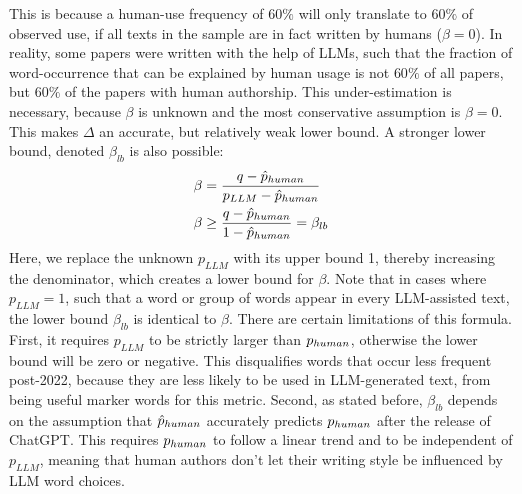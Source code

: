 This is because a human-use frequency of $60\%$ will only translate to $60\%$ of observed use, if all texts in the sample are in fact written by humans ($\beta=0$).
In reality, some papers were written with the help of LLMs, such that the fraction of word-occurrence that can be explained by human usage is not $60\%$ of all papers, but $60\%$ of the papers with human authorship.
This under-estimation is necessary, because $\beta$ is unknown and the most conservative assumption is $\beta=0$.
This makes $\Delta$ an accurate, but relatively weak lower bound.
A stronger lower bound, denoted $\beta_{lb}$ is also possible:
\begin{equation}\label{eq:beta_hat}
    \begin{split}
        \beta &= \frac{q -  \hat{p}_{human}}{p_{LLM}-\hat{p}_{human}}\\
        \beta &\ge \frac{q -  \hat{p}_{human}}{1-\hat{p}_{human}} = \beta_{lb}
    \end{split}
\end{equation}
Here, we replace the unknown $p_{LLM}$ with its upper bound 1, thereby increasing the denominator, which creates a lower bound for $\beta$.
Note that in cases where $p_{LLM}=1$, such that a word or group of words appear in every LLM-assisted text, the lower bound $\beta_{lb}$ is identical to $\beta$.
There are certain limitations of this formula.
First, it requires $p_{LLM}$ to be strictly larger than $p_{human}$, otherwise the lower bound will be zero or negative.
This disqualifies words that occur less frequent post-2022, because they are less likely to be used in LLM-generated text, from being useful marker words for this metric.
Second, as stated before, $\beta_{lb}$ depends on the assumption that $\hat{p}_{human}$ accurately predicts $p_{human}$ after the release of ChatGPT.
This requires $p_{human}$ to follow a linear trend and to be independent of $p_{LLM}$, meaning that human authors don't let their writing style be influenced by LLM word choices.

